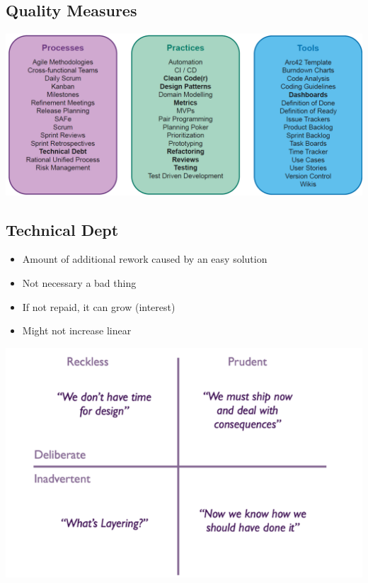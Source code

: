 \subsection{Quality Measures}
\includegraphics[width=\linewidth]{../img/quality_measures.png}

\subsection{Technical Dept}
\begin{itemize}
    \item Amount of additional rework caused by an easy solution
    \item Not necessary a bad thing
    \item If not repaid, it can grow (interest)
    \item Might not increase linear
\end{itemize}
\includegraphics[width=\linewidth]{../img/technical_dept.png}

